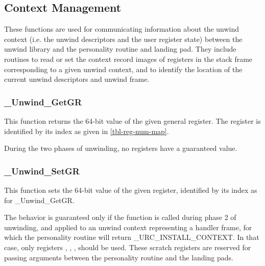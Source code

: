 \subsection{Context Management}

These functions are used for communicating information about the unwind
context (i.e. the unwind descriptors and the user register state) between
the unwind library and the personality routine and landing pad. They
include routines to read or set the context record images of registers in
the stack frame corresponding to a given unwind context, and to identify
the location of the current unwind descriptors and unwind frame.

\subsubsection{\_Unwind\_GetGR}


This function returns the 64-bit value of the given general register. 
The register is identified by its index as given in \ref{tbl-reg-num-map}.

During the two phases of unwinding, no registers have a guaranteed value.

\subsubsection{\_Unwind\_SetGR}


This function sets the 64-bit value of the given register, identified by 
its index as for \_Unwind\_GetGR.

The behavior is guaranteed only if the function is called during phase 2 
of unwinding, and applied to an unwind context representing a handler frame, 
for which the personality routine will return \_URC\_INSTALL\_CONTEXT. 
In that case, only registers \RDI, \RSI, \RDX, \RCX should be used. 
These scratch registers are reserved for passing arguments between the 
personality routine and the landing pads. 

